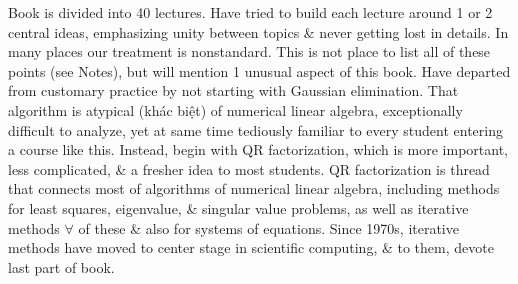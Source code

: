 \documentclass{article}
\begin{document}
\begin{itemize}
	Book is divided into 40 lectures. Have tried to build each lecture around 1 or 2 central ideas, emphasizing unity between topics \& never getting lost in details. In many places our treatment is nonstandard. This is not place to list all of these points (see Notes), but will mention 1 unusual aspect of this book. Have departed from customary practice by not starting with Gaussian elimination. That algorithm is atypical (khác biệt) of numerical linear algebra, exceptionally difficult to analyze, yet at same time tediously familiar to every student entering a course like this. Instead, begin with QR factorization, which is more important, less complicated, \& a fresher idea to most students. QR factorization is thread that connects most of algorithms of numerical linear algebra, including methods for least squares, eigenvalue, \& singular value problems, as well as iterative methods $\forall$ of these \& also for systems of equations. Since 1970s, iterative methods have moved to center stage in scientific computing, \& to them, devote last part of book.
	

\end{itemize}
\end{document}
